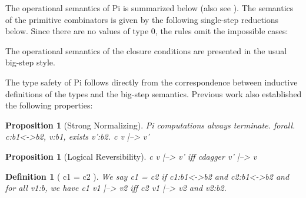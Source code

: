 \documentclass[preprint]{sigplanconf}
\newtheorem{definition}[theorem]{Definition}
\newtheorem{proposition}[theorem]{Proposition}
\begin{document}
The operational semantics of {{Pi}} is summarized below (also see
\cite{infeffects}).  The semantics of the primitive combinators is
given by the following single-step reductions below. Since there are
no values of type {{0}}, the rules omit the impossible cases:
\begin{scriptsize}
\end{scriptsize}
The operational semantics of the closure conditions are presented in
the usual big-step style.
\begin{scriptsize}
%
%
%
\end{scriptsize}

The type safety of {{Pi}} follows directly from the correspondence
between inductive definitions of the types and the big-step
semantics. Previous work also established the following properties:

\begin{proposition}[Strong Normalizing]
\label{prop:termination-pi} 
{{Pi}} computations always terminate.  
{{forall. c:b1<->b2, v:b1, exists v':b2.}}  
{{c v |--> v'}}
\end{proposition}

\begin{proposition}[Logical Reversibility]
\label{prop:logrev}
{{c v |--> v'}} iff 
{{ c{dagger} v' |--> v}}
\end{proposition}

\begin{definition}[ {{c1  = c2}} ]
We say {{c1 = c2}} if {{c1:b1<->b2}} and {{c2:b1<->b2}} and for all
{{v1:b}}, we have {{c1 v1 |--> v2}} iff {{c2 v1 |--> v2}} and {{v2:b2}}.
\end{definition}
\end{document}
